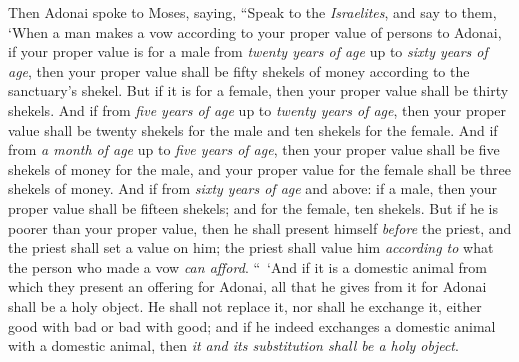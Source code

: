 \begin{biblechapter} %
 Then Adonai spoke to Moses, saying,
\verse “Speak to the \textit{Israelites}, and say to them, ‘When a man makes a vow according to your proper value of persons to Adonai,
\verse if your proper value is for a male from \textit{twenty years of age} up to \textit{sixty years of age}, then your proper value shall be fifty shekels of money according to the sanctuary’s shekel.
\verse But if it is for a female, then your proper value shall be thirty shekels.
\verse And if from \textit{five years of age} up to \textit{twenty years of age}, then your proper value shall be twenty shekels for the male and ten shekels for the female.
\verse And if from \textit{a month of age} up to \textit{five years of age}, then your proper value shall be five shekels of money for the male, and your proper value for the female shall be three shekels of money.
\verse And if from \textit{sixty years of age} and above: if a male, then your proper value shall be fifteen shekels; and for the female, ten shekels.
\verse But if he is poorer than your proper value, then he shall present himself \textit{before} the priest, and the priest shall set a value on him; the priest shall value him \textit{according to} what the person who made a vow \textit{can afford}.
\verse “ ‘And if it is a domestic animal from which they present an offering for Adonai, all that he gives from it for Adonai shall be a holy object.
\verse He shall not replace it, nor shall he exchange it, either good with bad or bad with good; and if he indeed exchanges a domestic animal with a domestic animal, then \textit{it and its substitution shall be a holy object}.

\end{biblechapter}
